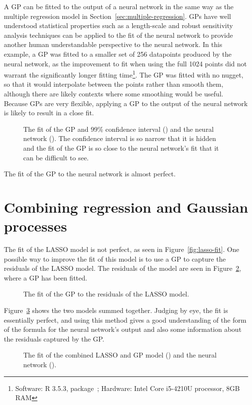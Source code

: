 A \ac{GP} can be fitted to the output of a neural network in the same way as the multiple regression model in Section~\ref{sec:multiple-regression}.
\acp{GP} have well understood statistical properties such as a length-scale and robust sensitivity analysis techniques can be applied to the fit of the neural network to provide another human understandable perspective to the neural network.
In this example, a \ac{GP} was fitted to a smaller set of 256 datapoints produced by the neural network, as the improvement to fit when using the full 1024 points did not warrant the significantly longer fitting time\footnote{Software: R 3.5.3,  package~\autocite{dancik2008}; Hardware: Intel Core i5-4210U processor, 8GB RAM}.
The \ac{GP} was fitted with no nugget, so that it would interpolate between the points rather than smooth them, although there are likely contexts where some smoothing would be useful.
Because \acp{GP} are very flexible, applying a \ac{GP} to the output of the neural network is likely to result in a close fit.

\begin{figure}[htbp]
	\centering
	
	\caption{The fit of the \ac{GP} and 99\% confidence interval (\gpcolour) and the neural network (\nncolour). The confidence interval is so narrow that it is hidden and the fit of the \ac{GP} is so close to the neural network's fit that it can be difficult to see.}
	\label{fig:gp-fit}
\end{figure}

The fit of the \ac{GP} to the neural network is almost perfect.

\section{Combining regression and Gaussian processes}

The fit of the \ac{LASSO} model is not perfect, as seen in Figure~\ref{fig:lasso-fit}.
One possible way to improve the fit of this model is to use a \ac{GP} to capture the residuals of the \ac{LASSO} model.
The residuals of the model are seen in Figure~\ref{fig:gp-resids-fit}, where a \ac{GP} has been fitted.

\begin{figure}[htbp]
	\centering
	
	\caption{The fit of the \ac{GP} to the residuals of the \ac{LASSO} model.}
	\label{fig:gp-resids-fit}
\end{figure}

Figure~\ref{fig:combined-fit} shows the two models summed together.
Judging by eye, the fit is essentially perfect, and using this method gives a good understanding of the form of the formula for the neural network's output and also some information about the residuals captured by the \ac{GP}.

\begin{figure}[htbp]
	\centering
	
	\caption{The fit of the combined \ac{LASSO} and \ac{GP} model (\combinedcolour) and the neural network (\nncolour).}
	\label{fig:combined-fit}
\end{figure}
